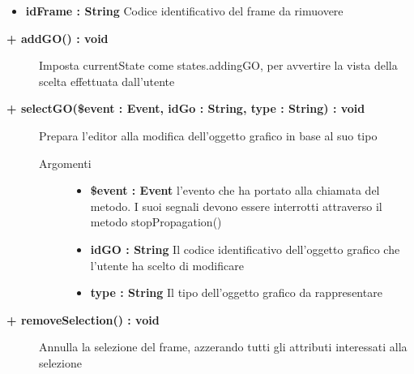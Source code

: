 \begin{description}
\begin{description}
\begin{description}
\begin{itemize}
					\item \textbf{idFrame : String	} \hfill
					Codice identificativo del frame da rimuovere		
				\end{itemize}
				
		\end{description}
	\end{description}
	
	\begin{description}
		\item[\textbf{\color{blue}+ addGO() : void	}] \hfill
			Imposta currentState come states.addingGO, per avvertire la vista della scelta effettuata dall'utente
		
	\end{description}
	
	\begin{description}
		\item[\textbf{\color{blue}+ selectGO(\$event : Event, idGo : String, type : String) : void 	}] \hfill
			Prepara l'editor alla modifica dell'oggetto grafico in base al suo tipo
			
		\begin{description}
			\item[Argomenti] \hfill
				\begin{itemize}
				
					\item \textbf{\$event : Event	} \hfill
					l'evento che ha portato alla chiamata del metodo. I suoi segnali devono essere interrotti attraverso il metodo stopPropagation()		
					\item \textbf{idGO : String	} \hfill
					Il codice identificativo dell'oggetto grafico che l'utente ha scelto di modificare
					\item \textbf{type : String	} \hfill
					Il tipo dell'oggetto grafico da rappresentare
				\end{itemize}
				
		\end{description}
	\end{description}
	
	\begin{description}
		\item[\textbf{\color{blue}+ removeSelection() : void	}] \hfill
			Annulla la selezione del frame, azzerando tutti gli attributi interessati alla selezione
		

\end{description}
\end{description}
